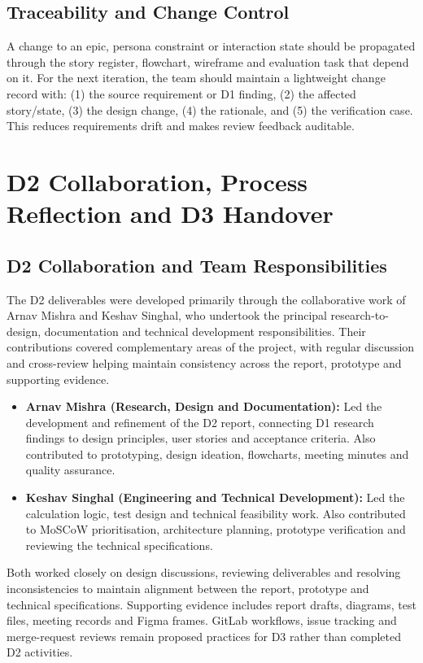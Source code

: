 \documentclass[12pt,a4paper]{article}
\begin{document}
\subsection{Traceability and Change Control}
A change to an epic, persona constraint or interaction state should be propagated through the story register, flowchart, wireframe and evaluation task that depend on it. For the next iteration, the team should maintain a lightweight change record with: (1) the source requirement or D1 finding, (2) the affected story/state, (3) the design change, (4) the rationale, and (5) the verification case. This reduces requirements drift and makes review feedback auditable.

\section{D2 Collaboration, Process Reflection and D3 Handover}

\subsection{D2 Collaboration and Team Responsibilities}

The D2 deliverables were developed primarily through the collaborative work of Arnav Mishra and Keshav Singhal, who undertook the principal research-to-design, documentation and technical development responsibilities. Their contributions covered complementary areas of the project, with regular discussion and cross-review helping maintain consistency across the report, prototype and supporting evidence.
\begin{itemize}[leftmargin=*]
  \item \textbf{Arnav Mishra (Research, Design and Documentation):} Led the development and refinement of the D2 report, connecting D1 research findings to design principles, user stories and acceptance criteria. Also contributed to prototyping, design ideation, flowcharts, meeting minutes and quality assurance.

  \item \textbf{Keshav Singhal (Engineering and Technical Development):} Led the calculation logic, test design and technical feasibility work. Also contributed to MoSCoW prioritisation, architecture planning, prototype verification and reviewing the technical specifications.
\end{itemize}
Both worked closely on design discussions, reviewing deliverables and resolving inconsistencies to maintain alignment between the report, prototype and technical specifications. Supporting evidence includes report drafts, diagrams, test files, meeting records and Figma frames. GitLab workflows, issue tracking and merge-request reviews remain proposed practices for D3 rather than completed D2 activities.
\end{document}
